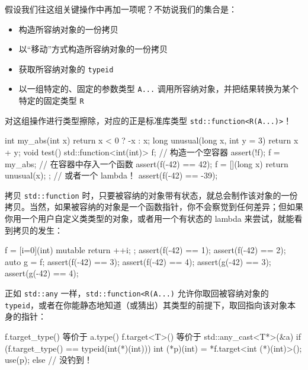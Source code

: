 假设我们往这组关键操作中再加一项呢？不妨说我们的集合是：

\begin{itemize}
\item 构造所容纳对象的一份拷贝
\item 以“移动”方式构造所容纳对象的一份拷贝
\item 获取所容纳对象的 \texttt{typeid}
\item 以一组特定的、固定的参数类型 \texttt{A...} 调用所容纳对象，并把结果转换为某个特定的固定类型 \texttt{R}
\end{itemize}

对这组操作进行类型擦除，对应的正是标准库类型 \texttt{std::\allowbreak{}function<\allowbreak{}R(\allowbreak{}A...)\allowbreak{}>}！

\begin{codebox}[cpp]
    int my_abs(int x) { return x < 0 ? -x : x; }
    long unusual(long x, int y = 3) { return x + y; }
    void test()
    {
      std::function<int(int)> f; // 构造一个空容器
      assert(!f);
      f = my_abs; // 在容器中存入一个函数
      assert(f(-42) == 42);
      f = [](long x) { return unusual(x); }; // 或者一个 lambda！
      assert(f(-42) == -39);
    }
\end{codebox}

拷贝 \texttt{std::\allowbreak{}function} 时，只要被容纳的对象带有状态，就总会制作该对象的一份拷贝。当然，如果被容纳的对象是一个函数指针，你不会察觉到任何差异；但如果你用一个用户自定义类类型的对象，或者用一个有状态的 lambda 来尝试，就能看到拷贝的发生：

\begin{codebox}[cpp]
    f = [i=0](int) mutable { return ++i; };
    assert(f(-42) == 1);
    assert(f(-42) == 2);
    auto g = f;
    assert(f(-42) == 3);
    assert(f(-42) == 4);
    assert(g(-42) == 3);
    assert(g(-42) == 4);
\end{codebox}

正如 \texttt{std::\allowbreak{}any} 一样，\texttt{std::\allowbreak{}function<\allowbreak{}R(\allowbreak{}A...)\allowbreak{}} 允许你取回被容纳对象的 \texttt{typeid}，或者在你能静态地知道（或猜出）其类型的前提下，取回指向该对象本身的指针：

\begin{codebox}[cpp]
    f.target_type() 等价于 a.type()
    f.target<T>() 等价于 std::any_cast<T*>(&a)
    if (f.target_type() == typeid(int(*)(int))) {
      int (*p)(int) = *f.target<int (*)(int)>();
      use(p);
    } else {
      // 没钓到！
    }
\end{codebox}


